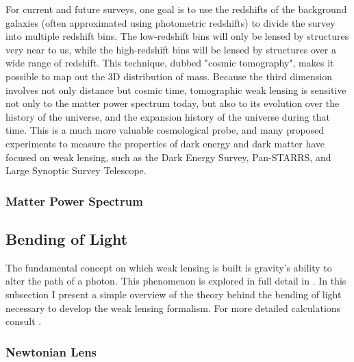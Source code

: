 \par For current and future surveys, one goal is to use the redshifts of the background galaxies (often approximated using photometric redshifts) to divide the survey into multiple redshift bins. The low-redshift bins will only be lensed by structures very near to us, while the high-redshift bins will be lensed by structures over a wide range of redshift. This technique, dubbed "cosmic tomography", makes it possible to map out the 3D distribution of mass. Because the third dimension involves not only distance but cosmic time, tomographic weak lensing is sensitive not only to the matter power spectrum today, but also to its evolution over the history of the universe, and the expansion history of the universe during that time. This is a much more valuable cosmological probe, and many proposed experiments to measure the properties of dark energy and dark matter have focused on weak lensing, such as the Dark Energy Survey, Pan-STARRS, and Large Synoptic Survey Telescope. 

\subsubsection{Matter Power Spectrum}
\cite{extragalactic}

\subsection{Bending of Light}
The fundamental concept on which weak lensing is built is gravity's ability to alter the path of a photon. This phenomenon is explored in full detail in \cite{GR1,basicLens,Mellier:1998pk}.
In this subsection I present a simple overview of the theory behind the bending of light necessary to develop the weak lensing formalism. For more detailed calculations consult \cite{GR1,basicLens,Mellier:1998pk}.
\subsubsection{Newtonian Lens}
\label{subsec:newtonlens}

